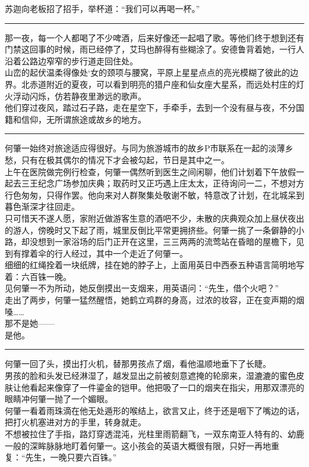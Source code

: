 \documentclass[oneside,11pt]{memoir} %
\begin{document}
\begin{CJK}{UTF8}{gbsn}
    苏迦向老板招了招手，举杯道：“我们可以再喝一杯。”\\\indent
\rule{-3pt}{30pt}
    那一夜，每一个人都喝了不少啤酒，后来好像还一起唱了歌。等他们终于想到还有门禁这回事的时候，雨已经停了，艾玛也醉得有些糊涂了。安德鲁背着她，一行人沿着公路边窄窄的步行道走回住处。\\\indent
    山峦的起伏温柔得像处`女的颈项与腰窝，平原上星星点点的亮光模糊了彼此的边界。北赤道附近的夏夜，可以看到明亮的猎户座和仙女座大星系，而远处村庄的灯火浮动闪烁，仿若静夜里渺远的歌声。\\\indent
    他们穿过夜风，踏过石子路，走在星空下，手牵手，去到一个没有昼与夜，不分国籍和信仰，无所谓旅途或故乡的地方。\\\indent
\rule{-3pt}{30pt}
    何肇一始终对旅途适应得很好。与同为旅游城市的故乡P市联系在一起的淡薄乡愁，只有在极其偶尔的情况下才会被勾起，节日是其中之一。\\\indent
    上午在医院做完例行检查，何肇一偶然听到医生之间闲聊，他们计划着下午放假一起去三王纪念广场参加庆典；取药时又正巧遇上庄太太，正待询问一二，不想对方行色匆匆，只得作罢。他向来对人群聚集处敬谢不敏，特意改了计划，在北城呆到暮色渐深才往回走。\\\indent
    只可惜天不遂人愿，家附近做游客生意的酒吧不少，未散的庆典观众加上昼伏夜出的游人，傍晚时又下起了雨，城里反倒比平常更拥挤些。何肇一挑了一条僻静的小路，却没想到一家浴场的后门正开在这里，三三两两的流莺站在昏暗的屋檐下，见到有撑着伞的行人经过，其中一个走近了何肇一。\\\indent
    细细的红绳拴着一块纸牌，挂在她的脖子上，上面用英日中西泰五种语言简明地写着：六百铢一晚。\\\indent
    见何肇一不为所动，她反倒摸出一支烟来，用英语问：“先生，借个火吧？”\\\indent
    走出了两步，何肇一猛然醒悟，她鹤立鸡群的身高，过浓的妆容，正在变声期的烟嗓……\\\indent
    那不是她——\\\indent
    是他。\\\indent
\rule{-3pt}{30pt}
    何肇一回了头，摸出打火机，替那男孩点了烟，看他温顺地垂下了长睫。\\\indent
    男孩的脸和头发已经淋湿了，越发显出之前被刻意遮掩的轮廓来，湿漉漉的蜜色皮肤让他看起来像穿了一件鎏金的铠甲。他把吸了一口的烟夹在指尖，用那双漂亮的眼睛冲何肇一抛了一个媚眼。\\\indent
    何肇一看着雨珠滴在他无处遁形的喉结上，欲言又止，终于还是咽下了嘴边的话，把打火机塞进对方的手里，转身就走。\\\indent
    不想被拉住了手指，路灯穿透混沌，光柱里雨箭翻飞，一双东南亚人特有的、幼鹿一般的深眸脉脉地盯着何肇一。这小孩会的英语大概很有限，只好一再地重复：“先生，一晚只要六百铢。”\\\indent

\end{CJK}
\end{document}

